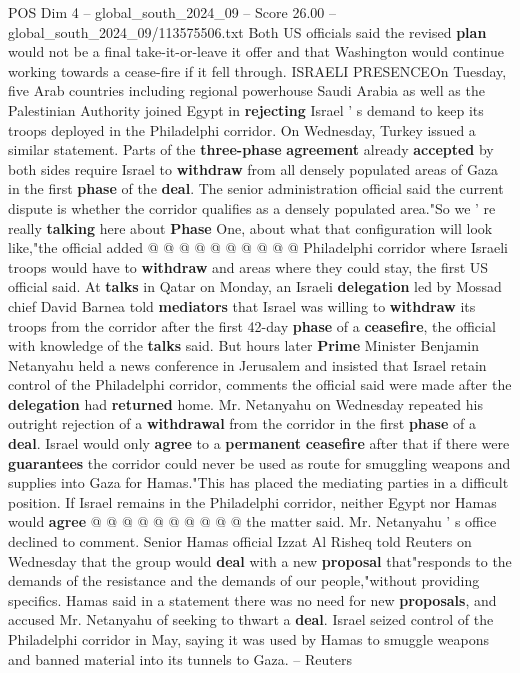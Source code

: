 \begin{textsample}{POS Dim 4 – global\_south\_2024\_09 – Score 26.00 – global\_south\_2024\_09/113575506.txt}
Both US officials said the revised \textbf{plan} would not be a final take-it-or-leave it offer and that Washington would continue working towards a cease-fire if it fell through.
ISRAELI PRESENCEOn Tuesday, five Arab countries including regional powerhouse Saudi Arabia as well as the Palestinian Authority joined Egypt in \textbf{rejecting} Israel ' s demand to keep its troops deployed in the Philadelphi corridor.
On Wednesday, Turkey issued a similar statement.
Parts of the \textbf{three-phase} \textbf{agreement} already \textbf{accepted} by both sides require Israel to \textbf{withdraw} from all densely populated areas of Gaza in the first \textbf{phase} of the \textbf{deal}.
The senior administration official said the current dispute is whether the corridor qualifies as a densely populated area."So we ' re really \textbf{talking} here about \textbf{Phase} One, about what that configuration will look like,"the official added @ @ @ @ @ @ @ @ @ @ Philadelphi corridor where Israeli troops would have to \textbf{withdraw} and areas where they could stay, the first US official said.
At \textbf{talks} in Qatar on Monday, an Israeli \textbf{delegation} led by Mossad chief David Barnea told \textbf{mediators} that Israel was willing to \textbf{withdraw} its troops from the corridor after the first 42-day \textbf{phase} of a \textbf{ceasefire}, the official with knowledge of the \textbf{talks} said.
But hours later \textbf{Prime} Minister Benjamin Netanyahu held a news conference in Jerusalem and insisted that Israel retain control of the Philadelphi corridor, comments the official said were made after the \textbf{delegation} had \textbf{returned} home.
Mr.
Netanyahu on Wednesday repeated his outright rejection of a \textbf{withdrawal} from the corridor in the first \textbf{phase} of a \textbf{deal}.
Israel would only \textbf{agree} to a \textbf{permanent} \textbf{ceasefire} after that if there were \textbf{guarantees} the corridor could never be used as route for smuggling weapons and supplies into Gaza for Hamas."This has placed the mediating parties in a difficult position.
If Israel remains in the Philadelphi corridor, neither Egypt nor Hamas would \textbf{agree} @ @ @ @ @ @ @ @ @ @ the matter said.
Mr.
Netanyahu ' s office declined to comment.
Senior Hamas official Izzat Al Risheq told Reuters on Wednesday that the group would \textbf{deal} with a new \textbf{proposal} that"responds to the demands of the resistance and the demands of our people,"without providing specifics.
Hamas said in a statement there was no need for new \textbf{proposals}, and accused Mr.
Netanyahu of seeking to thwart a \textbf{deal}.
Israel seized control of the Philadelphi corridor in May, saying it was used by Hamas to smuggle weapons and banned material into its tunnels to Gaza. -- Reuters

\end{textsample}
